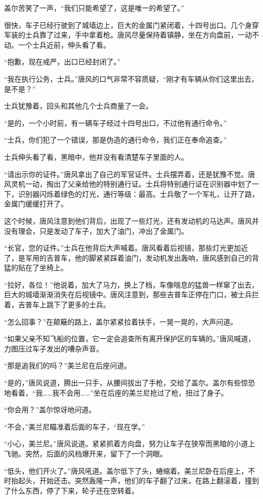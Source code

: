 盖尔苦笑了一声，“我们只能希望了，这是唯一的希望了。”

很快，车子已经行驶到了城墙边上，巨大的金属门紧闭着，十四号出口。几个身穿军装的士兵靠了过来，手中拿着枪。唐风尽量保持着镇静，坐在方向盘前，一动不动。一个士兵近前，伸头看了看。

“抱歉，现在戒严，出口已经封闭了。”

“我在执行公务，士兵。”唐风的口气非常不容质疑，“刚才有车辆从你们这里出去，是不是？”

士兵犹豫着，回头和其他几个士兵商量了一会。

“是的，一个小时前，有一辆车子经过十四号出口，不过他有通行命令。”

“士兵，你们犯了一个错误，那是伪造的通行命令，我们正在奉命追查。”

士兵伸头看了看，黑暗中，他并没有看清楚车子里面的人。

“请出示你的证件。”唐风拿出了自己的军官证件。士兵摆弄着，还是犹豫不觉。唐风灵机一动，掏出了父亲给他的特别通行证。士兵将特别通行证在识别器中划了一下，识别器闪烁着绿色的灯光，通行等级：最高。士兵敬了一个军礼，让开了路，金属门缓缓打开了。

这个时候，唐风注意到他们背后，出现了一些灯光，还有发动机的马达声。唐风并没有理会，只是发动了车子，加大了油门，冲出了金属门。

“长官，您的证件。”士兵在他背后大声喊着。唐风看着后视镜，那些灯光更加近了，是军用的吉普车，他的脚紧紧踩着油门，发动机发出轰响，唐风感到自己的背猛的贴在了坐椅上。

“拉好，各位！”他说着，加大了马力，换上了档，车像喘息的猛兽一样窜了出去，巨大的城墙渐渐消失在后视镜中。唐风注意到，那些吉普车正停在门口，被士兵拦着，吉普车上跳下了更多的士兵。

“怎么回事？”在颠簸的路上，盖尔紧紧拉着扶手，一晃一晃的，大声问道。

“如果父亲不知飞船的位置，它一定会追查所有离开保护区的车辆的。”唐风喊道，力图压过车子发出的嘈杂声音。

“那是追我们的吗？”美兰尼在后座问道。

“是的，”唐风说道，腾出一只手，从腰间拔出了手枪，交给了盖尔。盖尔有些惊恐地看着，“我……我不会用……”坐在后座的美兰尼抢过了枪，扭过了身子。

“你会用？”盖尔惊讶地问道。

“不会，”美兰尼瞄准着后面的车子，“现在学。”

“小心，美兰尼。”唐风说道。紧紧抓着方向盘，努力让车子在狭窄而黑暗的小道上飞驰。突然，后面的风档爆开来，留下了一个洞眼。

“低头，他们开火了。”唐风吼道。盖尔低下了头，蜷缩着。美兰尼卧在后座上，不时抬起头，开始还击。突然轰隆一声，他们的车子翻了过来，在路上翻滚着，撞到了什么东西，停了下来，轮子还在空转着。

